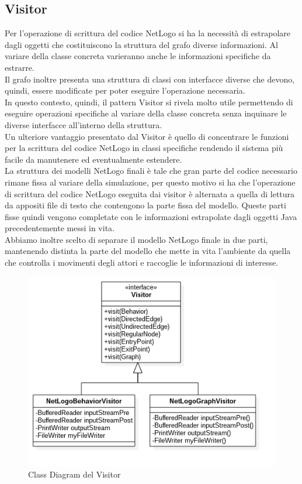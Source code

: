 \subsection{Visitor}
Per l'operazione di scrittura del codice NetLogo si ha la necessità di estrapolare dagli oggetti che costituiscono la struttura del grafo diverse informazioni. Al variare della classe concreta varieranno anche le informazioni specifiche da estrarre.\\
Il grafo inoltre presenta una struttura di classi con interfacce diverse che devono, quindi, essere modificate per poter eseguire l'operazione necessaria.\\
In questo contesto, quindi, il pattern Visitor si rivela molto utile permettendo di eseguire operazioni specifiche al variare della classe concreta senza inquinare le diverse interfacce all'interno della struttura.\\
Un ulteriore vantaggio presentato dal Visitor è quello di concentrare le funzioni per la scrittura del codice NetLogo in classi specifiche rendendo il sistema più facile da manutenere ed eventualmente estendere.\\
La struttura dei modelli NetLogo finali è tale che gran parte del codice necessario rimane fissa al variare della simulazione, per questo motivo si ha che l'operazione di scrittura del codice NetLogo eseguita dai visitor è alternata a quella di lettura da appositi file di testo che contengono la parte fissa del modello. Queste parti fisse quindi vengono completate con le informazioni estrapolate dagli oggetti Java precedentemente messi in vita.\\
Abbiamo inoltre scelto di separare il modello NetLogo finale in due parti, mantenendo distinta la parte del modello che mette in vita l'ambiente da quella che controlla i movimenti degli attori e raccoglie le informazioni di interesse.\\
\begin{figure}[htb]
\centering
\includegraphics[width=\textwidth,height=\textheight,keepaspectratio]{images/visitor-class-diagram.png}
\caption{Class Diagram del Visitor}
\label{fig:visitor-diagram}
\end{figure}
